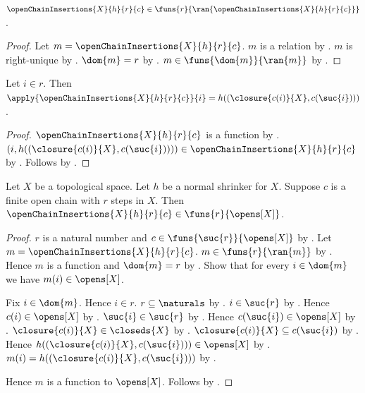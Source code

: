 \begin{proposition}\label{open_chain_insertions_function}
    $\openChainInsertions{X}{h}{r}{c}\in
        \funs{r}{\ran{\openChainInsertions{X}{h}{r}{c}}}$.
\end{proposition}
\begin{proof}
    Let $m=\openChainInsertions{X}{h}{r}{c}$.
    $m$ is a relation by .
    $m$ is right-unique
        by .
    $\dom{m}=r$
        by .
    $m\in\funs{\dom{m}}{\ran{m}}$
        by .
\end{proof}

\begin{proposition}\label{open_chain_insertions_value}
    Let $i\in r$.
    Then $\apply{\openChainInsertions{X}{h}{r}{c}}{i}
        =h((\closure{c(i)}{X},c(\suc{i})))$.
\end{proposition}
\begin{proof}
    $\openChainInsertions{X}{h}{r}{c}$ is a function
        by .
    $(i,h((\closure{c(i)}{X},c(\suc{i}))))
        \in\openChainInsertions{X}{h}{r}{c}$
        by .
    Follows by .
\end{proof}

\begin{proposition}\label{open_chain_insertions_typed}
    Let $X$ be a topological space.
    Let $h$ be a normal shrinker for $X$.
    Suppose $c$ is a finite open chain with $r$ steps in $X$.
    Then $\openChainInsertions{X}{h}{r}{c}
        \in\funs{r}{\opens[X]}$.
\end{proposition}
\begin{proof}
    $r$ is a natural number and
        $c\in\funs{\suc{r}}{\opens[X]}$
        by .
    Let $m=\openChainInsertions{X}{h}{r}{c}$.
    $m\in\funs{r}{\ran{m}}$ by .
    Hence $m$ is a function and $\dom{m}=r$ by .
    Show that for every $i\in\dom{m}$ we have $m(i)\in\opens[X]$.
    \begin{subproof}
        Fix $i\in\dom{m}$.
        Hence $i\in r$.
        $r\subseteq\naturals$
            by .
        $i\in\suc{r}$ by .
        Hence $c(i)\in\opens[X]$ by .
        $\suc{i}\in\suc{r}$
            by .
        Hence $c(\suc{i})\in\opens[X]$ by .
        $\closure{c(i)}{X}\in\closeds{X}$
            by .
        $\closure{c(i)}{X}\subseteq c(\suc{i})$
            by .
        Hence $h((\closure{c(i)}{X},c(\suc{i})))\in\opens[X]$
            by .
        $m(i)=h((\closure{c(i)}{X},c(\suc{i})))$
            by .
    \end{subproof}
    Hence $m$ is a function to $\opens[X]$.
    Follows by .
\end{proof}

